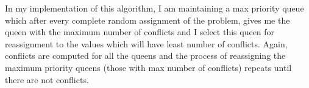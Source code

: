 \documentclass[conference]{IEEEtran}
\begin{document}
In my implementation of this algorithm, I am maintaining a max priority queue which after every complete random assignment of the problem, gives me the queen with the maximum number of conflicts and I select this queen for reassignment to the values which will have least number of conflicts. Again, conflicts are computed for all the queens and the process of reassigning the maximum priority queens (those with max number of conflicts) repeats until there are not conflicts.


%
%



%
%
\end{document}
